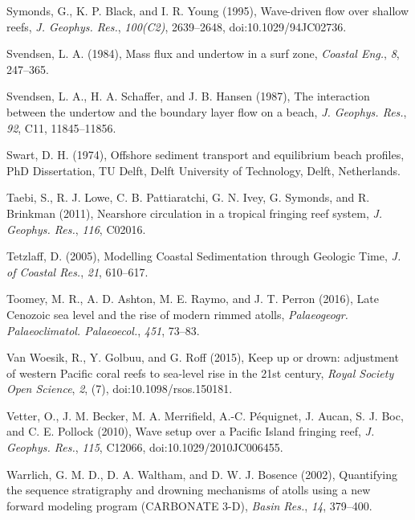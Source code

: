 \documentclass[default,jgrga]{agutex2015}
\begin{document}
\begin{article}
\begin{thebibliography}{}
Symonds, G., K. P. Black, and I. R. Young (1995), Wave-driven flow over shallow reefs, \textit{J. Geophys. Res.}, \textit{100(C2)}, 2639--2648, doi:10.1029/94JC02736.

Svendsen, L. A. (1984), Mass flux and undertow in a surf zone, \textit{Coastal Eng.}, \textit{8}, 247--365.

Svendsen, L. A., H. A. Schaffer, and J. B. Hansen (1987), The interaction between the undertow and the boundary layer flow on a beach, \textit{J. Geophys. Res.}, \textit{92}, C11, 11845--11856.

Swart, D. H. (1974), Offshore sediment transport and equilibrium beach profiles, PhD Dissertation, TU Delft, Delft University of Technology, Delft, Netherlands.

Taebi, S., R. J. Lowe, C. B. Pattiaratchi, G. N. Ivey,  G. Symonds, and R. Brinkman (2011), Nearshore circulation in a
tropical fringing reef system, \textit{J. Geophys. Res.}, \textit{116}, C02016.

Tetzlaff, D. (2005), Modelling Coastal Sedimentation through Geologic Time, \textit{J. of Coastal Res.}, \textit{21}, 610--617.

Toomey, M. R., A. D. Ashton, M. E. Raymo, and J. T. Perron (2016), Late Cenozoic sea level and the rise of modern rimmed atolls, \textit{Palaeogeogr. Palaeoclimatol. Palaeoecol.}, \textit{451}, 73--83.

Van Woesik, R., Y. Golbuu, and G. Roff (2015), Keep up or drown: adjustment of western Pacific coral reefs to sea-level rise in the 21st century, \textit{Royal Society Open Science}, \textit{2}, (7), doi:10.1098/rsos.150181.

Vetter, O., J. M. Becker, M. A. Merrifield, A.-C. P\'equignet, J. Aucan, S. J. Boc, and C. E. Pollock (2010), Wave setup over a Pacific Island fringing reef, \textit{J. Geophys. Res.}, \textit{115}, C12066, doi:10.1029/2010JC006455.

Warrlich, G. M. D., D. A. Waltham, and D. W. J. Bosence (2002), Quantifying the sequence stratigraphy and drowning mechanisms of atolls using a new forward modeling program (CARBONATE 3-D), \textit{Basin Res.}, \textit{14}, 379--400.


\end{thebibliography}
\end{article}
\end{document}
